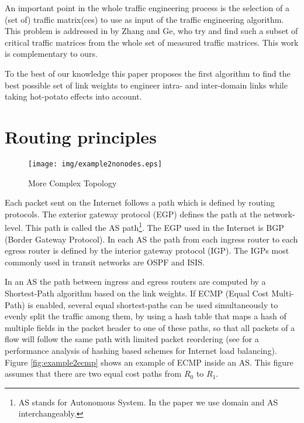 \documentclass{acm_proc_article-sp}
\begin{document}
An important point in the whole traffic engineering process is the
selection of a (set of) traffic matrix(ces) to use as input of the
traffic engineering algorithm. This problem is addressed in \cite{zhang} by Zhang and Ge, who try and
find such a subset of critical traffic matrices from the whole set of
measured traffic matrices. This work is complementary to ours.

To the best of our knowledge this paper proposes the first algorithm to find the
best possible set of link weights to engineer intra- and
  inter-domain links while taking hot-potato effects into account. 

\section{Routing principles}
\label{sec:survey}

\bigskip

\begin{figure}[htbp]
  \centering
  \texttt{[image: img/example2nonodes.eps]}
  \caption{More Complex Topology}
  \label{fig:example2nonodes}
\end{figure}

Each packet sent on the Internet follows a path which is defined by
routing protocols. The exterior gateway
protocol (EGP) defines the path at the network-level. This path is called
the AS path\footnote{AS stands for Autonomous System. In the paper we use domain
  and AS interchangeably.}. The EGP used
in the Internet is BGP (Border Gateway Protocol). In each AS the path
from each ingress router to each egress router is defined by the
interior gateway protocol (IGP). The IGPs most commonly used in
transit networks are OSPF and ISIS. 

In an AS the path between ingress and egress routers are
computed by a Shortest-Path algorithm based on the
link weights. If ECMP (Equal Cost Multi-Path) is enabled, several equal shortest-paths
can be used simultaneously to evenly
split the traffic among them, by using a hash table that
maps a hash of multiple fields in the packet header to one of these paths, 
so that all packets of a flow
will follow the same path with limited packet reordering (see
\cite{cao} for a performance analysis of hashing based schemes for
Internet load balancing). Figure \ref{fig:example2ecmp} shows an
example of ECMP inside an AS. This figure assumes that there are 
two equal cost paths from $R_0$ to $R_1$.
\end{document}
